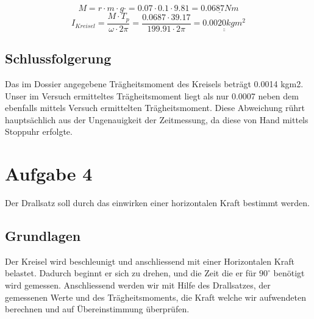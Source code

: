 \documentclass{article}
\begin{document}
\begin{equation}
M=r \cdot m \cdot g \cdot = 0.07 \cdot 0.1 \cdot 9.81 = \underline{0.0687Nm}
\end{equation}
\begin{equation}
 I_{Kreisel}= \frac{M \cdot T_p}{\omega \cdot 2\pi}= \frac{0.0687 \cdot 39.17}{199.91 \cdot 2\pi}= \underline{\underline{0.0020kgm^2}}
\end{equation}

\subsection{Schlussfolgerung}
Das im Dossier angegebene Trägheitsmoment des Kreisels beträgt 0.0014 kgm2. Unser im Versuch
ermitteltes Trägheitsmoment liegt als nur 0.0007 neben dem ebenfalls mittels Versuch ermittelten
Trägheitsmoment. Diese Abweichung rührt hauptsächlich aus der Ungenauigkeit der Zeitmessung, da
diese von Hand mittels Stoppuhr erfolgte.
\section{Aufgabe 4}
Der Drallsatz soll durch das einwirken einer horizontalen Kraft bestimmt werden.
\subsection{Grundlagen}
Der Kreisel wird beschleunigt und anschliessend mit einer Horizontalen Kraft belastet. Dadurch beginnt er sich zu drehen, und die Zeit die er für $90^\circ$ benötigt wird gemessen. Anschliessend werden wir mit Hilfe des Drallsatzes, der gemessenen Werte und des Trägheitsmoments, die Kraft welche wir aufwendeten berechnen und auf Übereinstimmung überprüfen.
\end{document}
